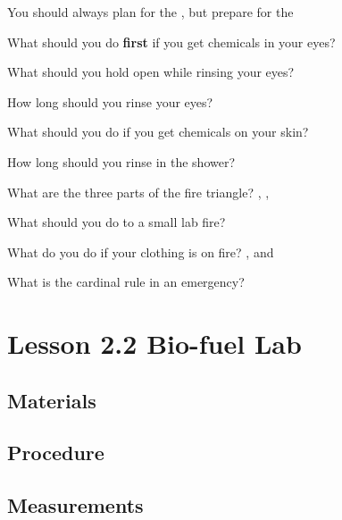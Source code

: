 \documentclass[12pt]{exam}
\begin{document}
\begin{questions}
    \question You should always plan for the \fillin[best], but prepare for the \fillin[worst]

    \question What should you do \textbf{first} if you get chemicals in your eyes? 

    \question What should you hold open while rinsing your eyes? 
    
    \question How long should you rinse your eyes? \fillin[15 - 20 minutes]

    \question What should you do if you get chemicals on your skin? 

    \question How long should you rinse in the shower? \fillin[15 minutes]

    \question What are the three parts of the fire triangle? \fillin[fuel], \fillin[oxygen], \fillin[heat]

    \question What should you do to a small lab fire? \fillin[smother it]

    \question What do you do if your clothing is on fire? \fillin[stop], \fillin[drop] and \fillin[roll]

    \question What is the cardinal rule in an emergency?

    \vspace{2cm}

\end{questions}

\newpage

\section*{Lesson 2.2 Bio-fuel Lab}

\subsection*{Materials}

\vspace{3cm}

\subsection*{Procedure}

\vspace{3cm}

\subsection*{Measurements}
\end{document}
